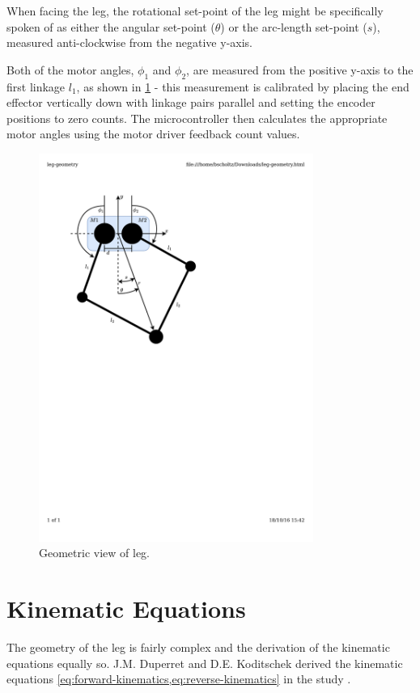When facing the leg, the rotational set-point of the leg might be specifically spoken of as either the angular set-point ($\theta$) or the arc-length set-point ($s$), measured anti-clockwise from the negative y-axis. 

Both of the motor angles, $\phi_1$ and $\phi_2$, are measured from the positive y-axis to the first linkage $l_1$, as shown in \cref{fig:Geometric view of leg} - this measurement is calibrated by placing the end effector vertically down with linkage pairs parallel and setting the encoder positions to zero counts. The microcontroller then calculates the appropriate motor angles using the motor driver feedback count values.

\begin{figure}
\centering
\includegraphics[clip, trim=2cm 15cm 7cm 2cm, page = 1, width=0.8\textwidth]{images/geometry/leg-geometry} 
\caption{Geometric view of leg.}
\label{fig:Geometric view of leg}
\end{figure}

\section{Kinematic Equations}
\label{sec:Kinematic Equations}
The geometry of the leg is fairly complex and the derivation of the kinematic equations equally so. J.M. Duperret and D.E. Koditschek derived the kinematic equations \cref{eq:forward-kinematics,eq:reverse-kinematics} in the study \cite{Duperret}. 

